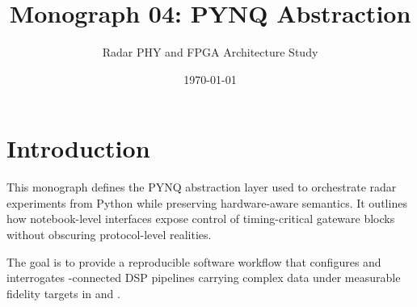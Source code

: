 \documentclass[11pt]{article}
\title{Monograph 04: PYNQ Abstraction}
\author{Radar PHY and FPGA Architecture Study}
\date{\today}
\begin{document}
\maketitle

\section{Introduction}
This monograph defines the PYNQ abstraction layer used to orchestrate radar experiments from Python while preserving hardware-aware semantics. It outlines how notebook-level interfaces expose control of timing-critical gateware blocks without obscuring protocol-level realities.

The goal is to provide a reproducible software workflow that configures and interrogates \AXIStream-connected DSP pipelines carrying complex \IandQ data under measurable fidelity targets in \SNR and \dBFS.



\end{document}
